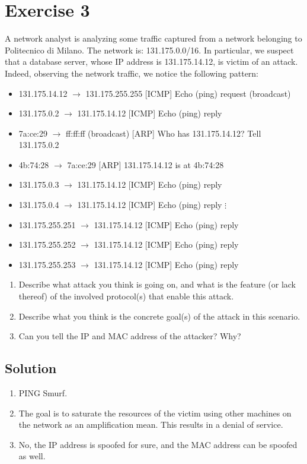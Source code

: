 \section{Exercise 3}

A network analyst is analyzing some traffic captured from a network belonging to Politecnico di Milano. 
The network is: 131.175.0.0/16. 
In particular, we suspect that a database server, whose IP address is 131.175.14.12, is victim of an attack. 
Indeed, observing the network traffic, we notice the following pattern:
\begin{itemize}
    \item 131.175.14.12 $\rightarrow$ 131.175.255.255 [ICMP] Echo (ping) request (broadcast)
    \item 131.175.0.2 $\rightarrow$ 131.175.14.12 [ICMP] Echo (ping) reply
    \item 7a:ce:29 $\rightarrow$ ff:ff:ff (broadcast) [ARP] Who has 131.175.14.12? Tell 131.175.0.2
    \item 4b:74:28 $\rightarrow$ 7a:ce:29 [ARP] 131.175.14.12 is at 4b:74:28
    \item 131.175.0.3 $\rightarrow$ 131.175.14.12 [ICMP] Echo (ping) reply
    \item 131.175.0.4 $\rightarrow$ 131.175.14.12 [ICMP] Echo (ping) reply $\vdots$
    \item 131.175.255.251 $\rightarrow$ 131.175.14.12 [ICMP] Echo (ping) reply
    \item 131.175.255.252 $\rightarrow$ 131.175.14.12 [ICMP] Echo (ping) reply
    \item 131.175.255.253 $\rightarrow$ 131.175.14.12 [ICMP] Echo (ping) reply
\end{itemize}

\begin{enumerate}
    \item Describe what attack you think is going on, and what is the feature (or lack thereof) of the involved protocol(s) that enable this attack.
    \item Describe what you think is the concrete goal(s) of the attack in this scenario. 
    \item Can you tell the IP and MAC address of the attacker? Why?
\end{enumerate}

\subsection*{Solution}
\begin{enumerate}
    \item PING Smurf. 
    \item The goal is to saturate the resources of the victim using other machines on the network as an amplification mean. 
        This results in a denial of service. 
    \item No, the IP address is spoofed for sure, and the MAC address can be spoofed as well.
\end{enumerate}